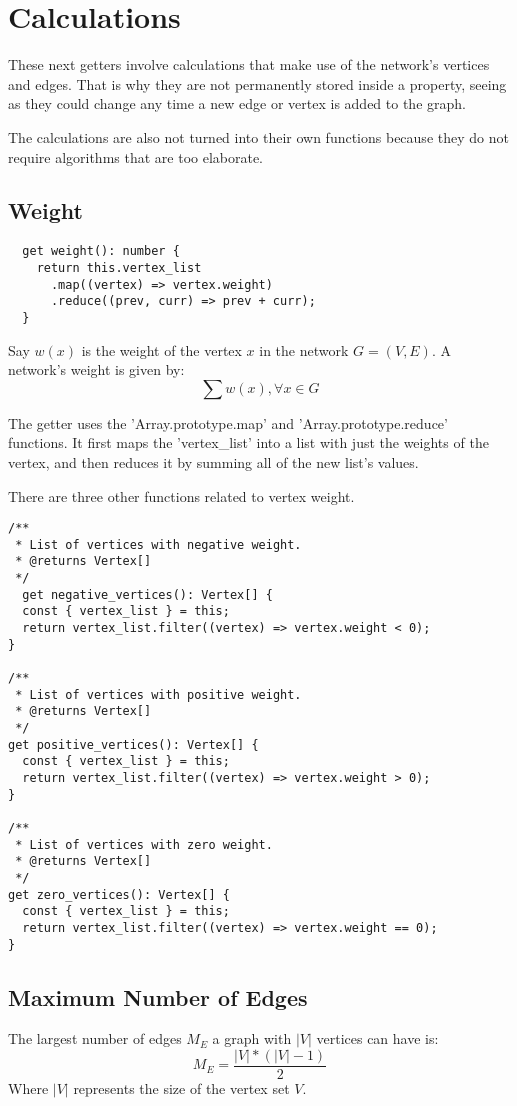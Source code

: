 \section{Calculations}
These next getters involve calculations that make use of the network's vertices and edges.
That is why they are not permanently stored inside a property,
seeing as they could change any time a new edge or vertex is added to the graph.

The calculations are also not turned into their own functions because they do not
require algorithms that are too elaborate.

\subsection{Weight}

\begin{verbatim}
  get weight(): number {
    return this.vertex_list
      .map((vertex) => vertex.weight)
      .reduce((prev, curr) => prev + curr);
  }
\end{verbatim}

Say $w(x)$ is the weight of the vertex $x$ in the network $G=(V,E)$. A network's weight is given by:
$$\sum{w(x)}, \forall x \in G$$

The getter uses the 'Array.prototype.map' and 'Array.prototype.reduce' functions.
It first maps the 'vertex\_list' into a list with just the weights of the vertex, and then reduces it by summing all of the new list's values.

There are three other functions related to vertex weight.

\begin{verbatim}
/**
 * List of vertices with negative weight.
 * @returns Vertex[]
 */
  get negative_vertices(): Vertex[] {
  const { vertex_list } = this;
  return vertex_list.filter((vertex) => vertex.weight < 0);
}

/**
 * List of vertices with positive weight.
 * @returns Vertex[]
 */
get positive_vertices(): Vertex[] {
  const { vertex_list } = this;
  return vertex_list.filter((vertex) => vertex.weight > 0);
}

/**
 * List of vertices with zero weight.
 * @returns Vertex[]
 */
get zero_vertices(): Vertex[] {
  const { vertex_list } = this;
  return vertex_list.filter((vertex) => vertex.weight == 0);
}
\end{verbatim}

\subsection{Maximum Number of Edges}
The largest number of edges $M_E$ a graph with $|V|$ vertices can have is:
$$M_E=\frac{|V|*(|V|-1)}{2}$$
Where $|V|$ represents the size of the vertex set $V$.

